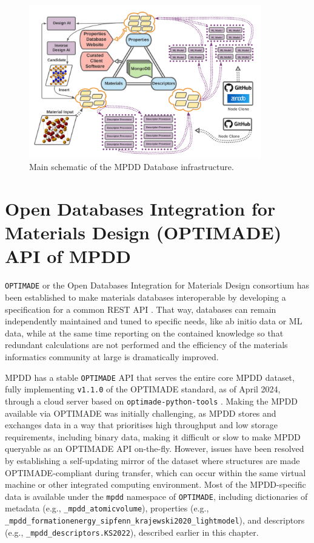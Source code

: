 \begin{figure}[H]
    \centering
    \includegraphics[width=0.9\textwidth]{mpdd/Picture1.png}
    \caption{Main schematic of the MPDD Database infrastructure.}
    \label{mpdd:fig:schematic}
\end{figure}





\section{Open Databases Integration for Materials Design (OPTIMADE) API of MPDD} \label{mpdd:sec:optimade}

\texttt{OPTIMADE} or the Open Databases Integration for Materials Design consortium has been established to make materials databases interoperable by developing a specification for a common REST API \cite{Evans2024DevelopmentsExchange}. That way, databases can remain independently maintained and tuned to specific needs, like ab initio data or ML data, while at the same time reporting on the contained knowledge so that redundant calculations are not performed and the efficiency of the materials informatics community at large is dramatically improved.

MPDD has a stable \texttt{OPTIMADE} API that serves the entire core MPDD dataset, fully implementing \texttt{v1.1.0} of the OPTIMADE standard, as of April 2024, through a cloud server based on \texttt{optimade-python-tools} \cite{Evans2021}.
Making the MPDD available via OPTIMADE was initially challenging, as MPDD stores and exchanges data in a way that prioritises high throughput and low storage requirements, including binary data, making it difficult or slow to make MPDD queryable as an OPTIMADE API on-the-fly.
However, issues have been resolved by establishing a self-updating mirror of the dataset where structures are made OPTIMADE-compliant during transfer, which can occur within the same virtual machine or other integrated computing environment. Most of the MPDD-specific data is available under the \texttt{mpdd} namespace of \texttt{OPTIMADE}, including dictionaries of metadata (e.g., \texttt{\_mpdd\_atomicvolume}), properties (e.g., \texttt{\_mpdd\_formationenergy\_sipfenn\_krajewski2020\_lightmodel}), and descriptors (e.g., \texttt{\_mpdd\_descriptors.KS2022}), described earlier in this chapter.

